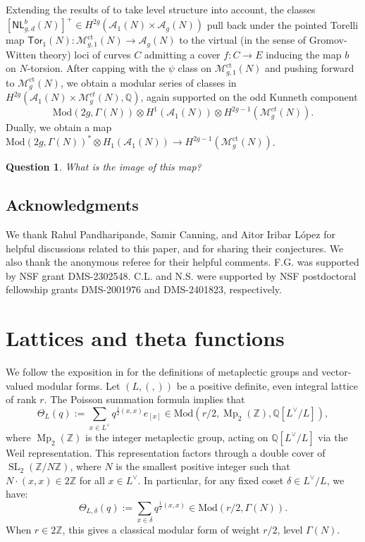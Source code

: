 \documentclass[12pt]{amsart}
\def\cA{\mathcal{A}}
\def\bC{\mathbb{C}}
\def\cM{\mathcal{M}}
\def\bQ{\mathbb{Q}}
\def\bZ{\mathbb{Z}}
\DeclareMathOperator{\ct}{ct}
\DeclareMathOperator{\SL}{SL}
\DeclareMathOperator{\Mp}{Mp}
\newcommand{\A}{\mathcal A}
\newcommand{\Mod}{\mathrm{Mod}}
\newcommand{\NL}{{\mathsf{NL}}}
\newcommand{\Tor}{{\mathsf{Tor}}}
\newtheorem{question}{Question}
\theoremstyle{definition}
\newcommand{\CL}[1]{{\color{blue}CL: #1}}
\begin{document}
Extending the results of \cite{gl} to take level structure into account, the classes $[\NL^b_{g,d}(N)]^+\in H^{2g}(\cA_1(N)\times\cA_g(N))$ pull back under the pointed Torelli map $\Tor_1(N):\cM_{g,1}^{\ct}(N)\to \cA_g(N)$ to the virtual (in the sense of Gromov-Witten theory) loci of curves $C$ admitting a cover $f:C\to E$ inducing the map $b$ on $N$-torsion. After capping with the $\psi$ class on $\cM_{g,1}^{\ct}(N)$ and pushing forward to $\cM^{\ct}_g(N)$, we obtain a modular series of classes in $H^{2g}(\A_1(N)\times \cM_g^{ct}(N),\bQ)$, again supported on the odd Kunneth component
\begin{equation*}
\Mod(2g,\Gamma(N))\otimes H^1(\A_1(N))\otimes H^{2g-1}(\cM_g^{ct}(N)).
\end{equation*}
Dually, we obtain a map $\Mod(2g,\Gamma(N))^* \otimes H_1(\A_1(N)) \to H^{2g-1}(\cM^{\ct}_g(N))$. 

\begin{question}
    What is the image of this map?
\end{question}

\subsection{Acknowledgments} 

We thank Rahul Pandharipande, Samir Canning, and Aitor Iribar L\'{o}pez for helpful discussions related to this paper, and for sharing their conjectures. We also thank the anonymous referee for their helpful comments. F.G. was supported by NSF grant DMS-2302548. C.L. and N.S. were supported by NSF postdoctoral fellowship grants DMS-2001976 and DMS-2401823, respectively. 


\section{Lattices and theta functions}
We follow the exposition in \cite{mp} for the definitions of metaplectic groups and vector-valued modular forms.
Let $(L,(,))$ be a positive definite, even integral lattice of rank $r$. The Poisson summation formula implies that 
$$\Theta_L(q) := \sum_{x\in L^\vee} q^{\frac{1}{2}(x,x)}e_{[x]}\in \Mod(r/2,\Mp_2(\bZ),\bQ[L^\vee/L]),$$
where $\Mp_2(\bZ)$ is the integer metaplectic group, acting on $\bQ[L^\vee/L]$ via the Weil representation. This representation factors through a double cover of $\SL_2(\bZ/N\bZ)$, where $N$ is the smallest positive integer such that $N\cdot (x,x)\in 2\bZ$ for all $x\in L^\vee$. In particular, for any fixed coset $\delta\in L^\vee/L$, we have:
$$\Theta_{L,\delta}(q) := \sum_{x\in \delta} q^{\frac{1}{2}(x,x)} \in \Mod(r/2,\Gamma(N)).$$
When $r\in 2\bZ$, this gives a classical modular form of weight $r/2$, level $\Gamma(N)$.
\end{document}
